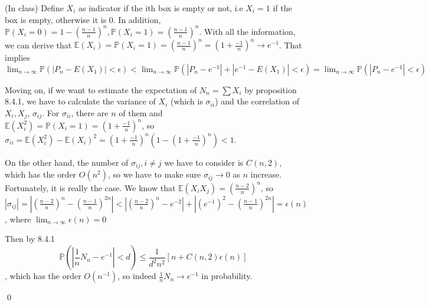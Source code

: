 \begin{answer}(In class)
Define $X_i$ as indicator if the ith box is empty or not, i.e $X_i = 1$ if the box is empty, otherwise it is 0. In addition, $\mathbb{P}(X_i = 0) = 1 - (\frac{n-1}{n})^n, \mathbb{P}(X_i = 1) = (\frac{n-1}{n})^n$.
With all the information, we can derive that $\mathbb{E}(X_i) = \mathbb{P}(X_i = 1) =  (\frac{n-1}{n})^n = (1 + \frac{-1}{n})^n \to e^{-1}$.
That implies $ \lim_{n \to \infty} \mathbb{P}(|P_n - E(X_1)| < \epsilon) <  \lim_{n \to \infty} \mathbb{P}(|P_n - e^{-1}| + |e^{-1} - E(X_1)| < \epsilon)  = \lim_{n \to \infty} \mathbb{P}(|P_n - e^{-1}| < \epsilon) $

Moving on, if we want to estimate the expectation of $N_n = \sum X_i$ by proposition 8.4.1, we have to calculate the variance of $X_i$ (which is $\sigma_{ii}$) and the correlation of $X_i,X_j$, $\sigma_{ij}$.
For $\sigma_{ii}$, there are $n$ of them and $\mathbb{E}(X_i^2) = \mathbb{P}(X_i = 1)= (1 + \frac{-1}{n})^n$, so $\sigma_{ii}  = \mathbb{E}(X_i^2) - \mathbb{E}(X_i)^2 = (1 + \frac{-1}{n})^n(1 - (1 + \frac{-1}{n})^n) < 1$. 

On the other hand, the number of $\sigma_{ij}, i\neq j$ we have to consider is $C(n,2)$, which has the order $O(n^2)$, so we have to make sure $\sigma_{ij} \to 0$ as $n$ increase. Fortunately, it is really the case. We know that $\mathbb{E}(X_i X_j) = (\frac{n-2}{n})^n$, so $|\sigma_{ij}| = |(\frac{n-2}{n})^n - (\frac{n-1}{n})^{2n}| < |(\frac{n-2}{n})^n - e^{-2}| +| (e^{-1})^2 - (\frac{n-1}{n})^{2n}|  = \epsilon(n)$, where $\lim_{n \to \infty}\epsilon(n)  = 0$

Then by 8.4.1
$$
    \mathbb{P} \left( |\frac{1}{n}N_n - e^{-1}| < d \right) \leq \frac{1}{d^2 n^2}\left[ n + C(n,2)\epsilon(n) \right] 
$$, which has the order $O(n^{-1})$, so indeed $\frac{1}{n}N_n \to  e^{-1}$ in probability.

\qquad \qed
\end{answer}

